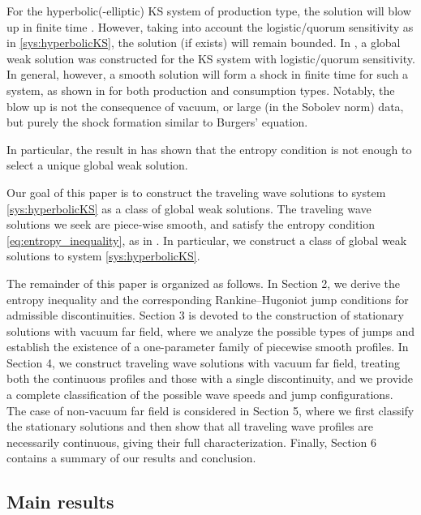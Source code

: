 \documentclass[12pt]{article}
\theoremstyle{definition}
\theoremstyle{remark}
\numberwithin{equation}{section}
\begin{document}
For the hyperbolic(-elliptic) KS system of production type, the solution will blow up in finite time \cite{liuLargeFrictionLimit2026}. However, taking into account the logistic/quorum sensitivity as in \eqref{sys:hyperbolicKS}, the solution (if exists) will remain bounded. In \cite{perthameExistenceSolutionsHyperbolic2009}, 
a global weak solution was constructed for the KS system with logistic/quorum sensitivity. In general, however, a smooth solution will form a shock in finite time for such a system, as shown in  \cite{leeThresholdShockFormation2015, mengGlobalWellposednessBlowup2024,naFinitetimeBlowupHyperbolic2024} for both production and consumption types. Notably, the blow up is not the consequence of vacuum, or large (in the Sobolev norm) data, but purely the shock formation similar to Burgers' equation.

In particular, the result in \cite{perthameExistenceSolutionsHyperbolic2009} has shown that the entropy condition is not enough to select a unique global weak solution. 

Our goal of this paper is to construct the traveling wave solutions to system \eqref{sys:hyperbolicKS} as a class of global weak solutions. The traveling wave solutions we seek are piece-wise smooth, and satisfy the entropy condition \eqref{eq:entropy_inequality}, as in \cite{perthameExistenceSolutionsHyperbolic2009}. In particular, we construct a class of global weak solutions to system \eqref{sys:hyperbolicKS}. 

The remainder of this paper is organized as follows. In Section 2, we derive the entropy inequality and the corresponding Rankine–Hugoniot jump conditions for admissible discontinuities. Section 3 is devoted to the construction of stationary solutions with vacuum far field, where we analyze the possible types of jumps and establish the existence of a one-parameter family of piecewise smooth profiles. In Section 4, we construct traveling wave solutions with vacuum far field, treating both the continuous profiles and those with a single discontinuity, and we provide a complete classification of the possible wave speeds and jump configurations. The case of non-vacuum far field is considered in Section 5, where we first classify the stationary solutions and then show that all traveling wave profiles are necessarily continuous, giving their full characterization. Finally, Section 6 contains a summary of our results and conclusion.


\subsection{Main results}
\end{document}
